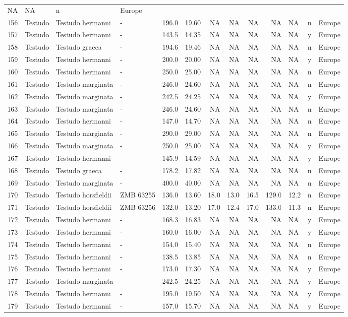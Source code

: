 \documentclass[]{article}
\begin{document}
\begin{longtable}[]{@{}llllrrrrrrlll@{}}
NA & NA & n & Europe\tabularnewline
156 & Testudo & Testudo hermanni & - & 196.0 & 19.60 & NA & NA & NA & NA
& NA & n & Europe\tabularnewline
157 & Testudo & Testudo hermanni & - & 143.5 & 14.35 & NA & NA & NA & NA
& NA & y & Europe\tabularnewline
158 & Testudo & Testudo graeca & - & 194.6 & 19.46 & NA & NA & NA & NA &
NA & n & Europe\tabularnewline
159 & Testudo & Testudo hermanni & - & 200.0 & 20.00 & NA & NA & NA & NA
& NA & y & Europe\tabularnewline
160 & Testudo & Testudo hermanni & - & 250.0 & 25.00 & NA & NA & NA & NA
& NA & n & Europe\tabularnewline
161 & Testudo & Testudo marginata & - & 246.0 & 24.60 & NA & NA & NA &
NA & NA & n & Europe\tabularnewline
162 & Testudo & Testudo marginata & - & 242.5 & 24.25 & NA & NA & NA &
NA & NA & y & Europe\tabularnewline
163 & Testudo & Testudo marginata & - & 246.0 & 24.60 & NA & NA & NA &
NA & NA & n & Europe\tabularnewline
164 & Testudo & Testudo hermanni & - & 147.0 & 14.70 & NA & NA & NA & NA
& NA & n & Europe\tabularnewline
165 & Testudo & Testudo marginata & - & 290.0 & 29.00 & NA & NA & NA &
NA & NA & n & Europe\tabularnewline
166 & Testudo & Testudo marginata & - & 250.0 & 25.00 & NA & NA & NA &
NA & NA & y & Europe\tabularnewline
167 & Testudo & Testudo hermanni & - & 145.9 & 14.59 & NA & NA & NA & NA
& NA & y & Europe\tabularnewline
168 & Testudo & Testudo graeca & - & 178.2 & 17.82 & NA & NA & NA & NA &
NA & n & Europe\tabularnewline
169 & Testudo & Testudo marginata & - & 400.0 & 40.00 & NA & NA & NA &
NA & NA & n & Europe\tabularnewline
170 & Testudo & Testudo horsfieldii & ZMB 63255 & 136.0 & 13.60 & 18.0 &
13.0 & 16.5 & 129.0 & 12.2 & n & Europe\tabularnewline
171 & Testudo & Testudo horsfieldii & ZMB 63256 & 132.0 & 13.20 & 17.0 &
12.4 & 17.0 & 133.0 & 11.3 & n & Europe\tabularnewline
172 & Testudo & Testudo hermanni & - & 168.3 & 16.83 & NA & NA & NA & NA
& NA & y & Europe\tabularnewline
173 & Testudo & Testudo hermanni & - & 160.0 & 16.00 & NA & NA & NA & NA
& NA & y & Europe\tabularnewline
174 & Testudo & Testudo hermanni & - & 154.0 & 15.40 & NA & NA & NA & NA
& NA & n & Europe\tabularnewline
175 & Testudo & Testudo hermanni & - & 138.5 & 13.85 & NA & NA & NA & NA
& NA & n & Europe\tabularnewline
176 & Testudo & Testudo hermanni & - & 173.0 & 17.30 & NA & NA & NA & NA
& NA & y & Europe\tabularnewline
177 & Testudo & Testudo marginata & - & 242.5 & 24.25 & NA & NA & NA &
NA & NA & y & Europe\tabularnewline
178 & Testudo & Testudo hermanni & - & 195.0 & 19.50 & NA & NA & NA & NA
& NA & y & Europe\tabularnewline
179 & Testudo & Testudo hermanni & - & 157.0 & 15.70 & NA & NA & NA & NA
& NA & y & Europe\tabularnewline

\end{longtable}
\end{document}

